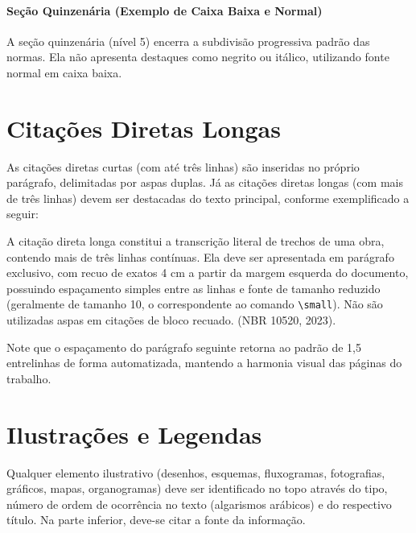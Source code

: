 \paragraph{Seção Quinzenária (Exemplo de Caixa Baixa e Normal)}

A seção quinzenária (nível 5) encerra a subdivisão progressiva padrão das normas. Ela não apresenta destaques como negrito ou itálico, utilizando fonte normal em caixa baixa.

\section{Citações Diretas Longas}

As citações diretas curtas (com até três linhas) são inseridas no próprio parágrafo, delimitadas por aspas duplas. Já as citações diretas longas (com mais de três linhas) devem ser destacadas do texto principal, conforme exemplificado a seguir:

\begin{citacaolonga}
A citação direta longa constitui a transcrição literal de trechos de uma obra, contendo mais de três linhas contínuas. Ela deve ser apresentada em parágrafo exclusivo, com recuo de exatos 4 cm a partir da margem esquerda do documento, possuindo espaçamento simples entre as linhas e fonte de tamanho reduzido (geralmente de tamanho 10, o correspondente ao comando \texttt{\textbackslash small}). Não são utilizadas aspas em citações de bloco recuado. (NBR 10520, 2023).
\end{citacaolonga}

Note que o espaçamento do parágrafo seguinte retorna ao padrão de 1,5 entrelinhas de forma automatizada, mantendo a harmonia visual das páginas do trabalho.

\section{Ilustrações e Legendas}

Qualquer elemento ilustrativo (desenhos, esquemas, fluxogramas, fotografias, gráficos, mapas, organogramas) deve ser identificado no topo através do tipo, número de ordem de ocorrência no texto (algarismos arábicos) e do respectivo título. Na parte inferior, deve-se citar a fonte da informação.

